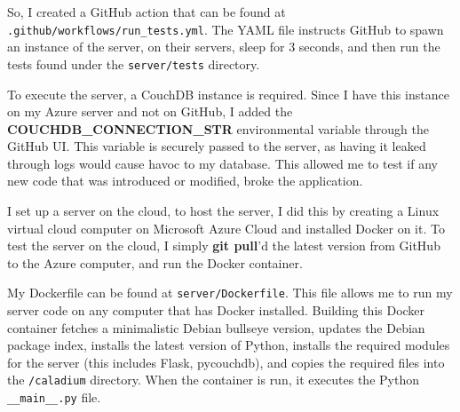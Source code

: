 So, I created a GitHub action that can be found at \\
\texttt{.github/workflows/run\_tests.yml}.
The YAML file instructs GitHub to spawn an instance of the server, on their servers,
sleep for 3 seconds, and then run the tests found
under the \texttt{server/tests} directory.

To execute the server, a CouchDB instance is required.
Since I have this instance on my Azure server and not on GitHub, I added the \\
\textbf{COUCHDB\_CONNECTION\_STR}
environmental variable through the GitHub UI.
This variable is securely passed to the server,
as having it leaked through logs would cause havoc to my database.
This allowed me to test if any new code that
was introduced or modified, broke the application.

I set up a server on the cloud, to host the server,
I did this by creating a Linux virtual cloud computer on
Microsoft Azure Cloud and installed Docker on it.
To test the server on the cloud, I simply \textbf{git pull}'d
the latest version from GitHub to the Azure computer,
and run the Docker container.

My Dockerfile can be found at \texttt{server/Dockerfile}.
This file allows me to run my server code on any computer that has Docker installed.
Building this Docker container fetches a minimalistic Debian bullseye version,
updates the Debian package index, installs the latest version of Python,
installs the required modules for the server (this includes Flask, pycouchdb),
and copies the required files into the \texttt{/caladium} directory.
When the container is run, it executes the Python \texttt{\_\_main\_\_.py} file.
